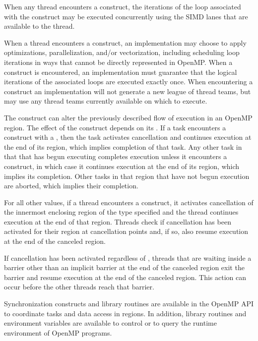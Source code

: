 When any thread encounters a  construct, the iterations of the loop associated with
the construct may be executed concurrently using the SIMD lanes that are available to
the thread.

When a thread encounters a  construct, an implementation may
choose to apply optimizations, parallelization, and/or vectorization, including
scheduling loop iterations in ways that cannot be directly represented in
OpenMP. When a  construct is encountered, an implementation
must guarantee that the logical iterations of the associated loops are executed
exactly once. When encountering a  construct an implementation
will not generate a new league of thread teams, but may use any thread teams
currently available on which to execute. 

The  construct can alter the previously described flow of execution in an
OpenMP region. The effect of the  construct depends on its 
. If a task encounters a  
construct with a  
, then the task activates cancellation 
and continues execution at the end of its
 region, which implies completion of that task. 
Any other task in that 
that has begun executing completes execution unless it encounters a 
 construct, in which case it continues execution at the end of its  region,
which implies its completion. Other tasks in that  region that have not
begun execution are aborted, which implies their completion.

For all other  values, if a 
thread encounters a  construct, it
activates cancellation of the innermost enclosing region of the type specified and the 
thread continues execution at the end of that region. Threads check if cancellation has 
been activated for their region at cancellation points and, if so, also resume execution at 
the end of the canceled region.

If cancellation has been activated regardless of , 
threads that are
waiting inside a barrier other than an implicit barrier at the end of the canceled region 
exit the barrier and resume execution at the end of the canceled region. This action can 
occur before the other threads reach that barrier.

Synchronization constructs and library routines are available in the OpenMP API to 
coordinate tasks and data access in  regions. In addition, library routines and
environment variables are available to control or to query the runtime environment of 
OpenMP programs.

